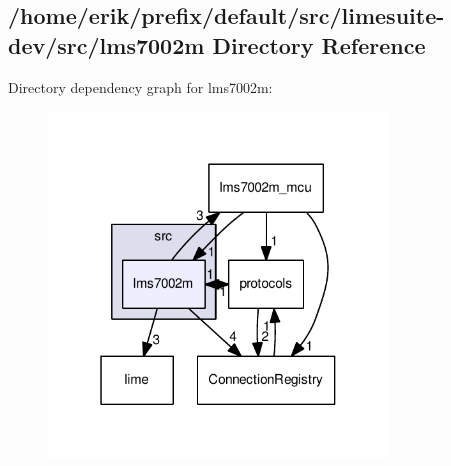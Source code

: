 \subsection{/home/erik/prefix/default/src/limesuite-\/dev/src/lms7002m Directory Reference}
\label{dir_2c179191e0a238add0632c136281cae9}
Directory dependency graph for lms7002m\+:
\nopagebreak
\begin{figure}[H]
\begin{center}
\leavevmode
\includegraphics[width=256pt]{dir_2c179191e0a238add0632c136281cae9_dep}
\end{center}
\end{figure}
